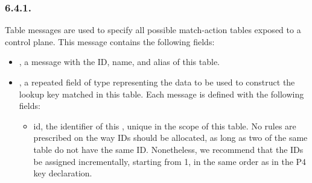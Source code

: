 \documentclass[11pt]{article}
\begin{document}
{%
\subsubsection{6.4.1.\hspace*{0.5em}}\label{sec-table}%

\noindent{}Table messages are used to specify all possible match-action tables exposed to a
control plane. This message contains the following fields:%

\begin{itemize}%

\item{}
, a  message with the ID, name, and alias of this table.%

\item{}
, a repeated field of type  representing the data to
be used to construct the lookup key matched in this table. Each 
message is defined with the following fields:%

\begin{itemize}%

\item{}
id, the  identifier of this , unique in the scope of
this table. No rules are prescribed on the way  IDs should be
allocated, as long as two  of the same table do not have the
same ID. Nonetheless, we recommend that the IDs be assigned incrementally,
starting from 1, in the same order as in the P4 key declaration.%


\end{itemize}
\end{itemize}}
\end{document}
